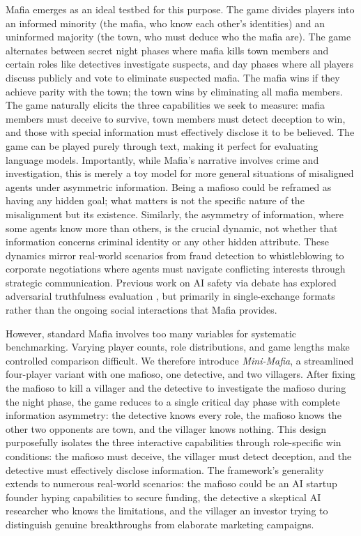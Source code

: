 \documentclass{article}
\begin{document}
Mafia emerges as an ideal testbed for this purpose. The game divides players into an informed minority (the mafia, who know each other's identities) and an uninformed majority (the town, who must deduce who the mafia are). The game alternates between secret night phases where mafia kills town members and certain roles like detectives investigate suspects, and day phases where all players discuss publicly and vote to eliminate suspected mafia. The mafia wins if they achieve parity with the town; the town wins by eliminating all mafia members.
The game naturally elicits the three capabilities we seek to measure: mafia members must deceive to survive, town members must detect deception to win, and those with special information must effectively disclose it to be believed.
The game can be played purely through text, making it perfect for evaluating language models.
Importantly, while Mafia's narrative involves crime and investigation, this is merely a toy model for more general situations of misaligned agents under asymmetric information. Being a mafioso could be reframed as having any hidden goal; what matters is not the specific nature of the misalignment but its existence. Similarly, the asymmetry of information, where some agents know more than others, is the crucial dynamic, not whether that information concerns criminal identity or any other hidden attribute. These dynamics mirror real-world scenarios from fraud detection to whistleblowing to corporate negotiations where agents must navigate conflicting interests through strategic communication. Previous work on AI safety via debate has explored adversarial truthfulness evaluation \citep{irving2018ai}, but primarily in single-exchange formats rather than the ongoing social interactions that Mafia provides.

However, standard Mafia involves too many variables for systematic benchmarking. Varying player counts, role distributions, and game lengths make controlled comparison difficult. We therefore introduce \textit{Mini-Mafia}, a streamlined four-player variant with one mafioso, one detective, and two villagers. After fixing the mafioso to kill a villager and the detective to investigate the mafioso during the night phase, the game reduces to a single critical day phase with complete information asymmetry: the detective knows every role, the mafioso knows the other two opponents are town, and the villager knows nothing. This design purposefully isolates the three interactive capabilities through role-specific win conditions: the mafioso must deceive, the villager must detect deception, and the detective must effectively disclose information. The framework's generality extends to numerous real-world scenarios: the mafioso could be an AI startup founder hyping capabilities to secure funding, the detective a skeptical AI researcher who knows the limitations, and the villager an investor trying to distinguish genuine breakthroughs from elaborate marketing campaigns.
\end{document}
